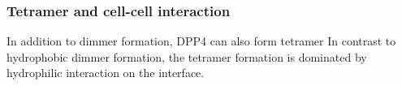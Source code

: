 \subsubsection{Tetramer and cell-cell interaction}

In addition to dimmer formation, DPP4 can also form tetramer In contrast to hydrophobic dimmer formation, the tetramer formation is dominated by hydrophilic interaction on the interface.~\cite{Engel_2003} 